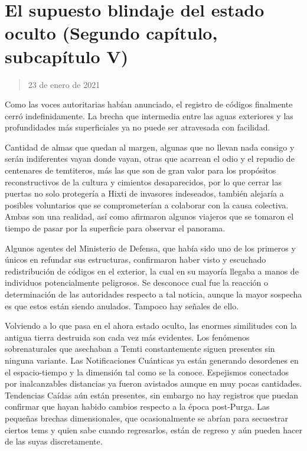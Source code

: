 \documentclass[
  spanish,
]{book}
\begin{document}
\hypertarget{el-supuesto-blindaje-del-estado-oculto-segundo-capuxedtulo-subcapuxedtulo-v}{%
\section{El supuesto blindaje del estado oculto (Segundo capítulo, subcapítulo V)}\label{el-supuesto-blindaje-del-estado-oculto-segundo-capuxedtulo-subcapuxedtulo-v}}

\begin{quote}
23 de enero de 2021
\end{quote}

Como las voces autoritarias habían anunciado, el registro de códigos finalmente cerró indefinidamente. La brecha que intermedia entre las aguas exteriores y las profundidades más superficiales ya no puede ser atravesada con facilidad.

Cantidad de almas que quedan al margen, algunas que no llevan nada consigo y serán indiferentes vayan donde vayan, otras que acarrean el odio y el repudio de centenares de temtiteros, más las que son de gran valor para los propósitos reconstructivos de la cultura y cimientos desaparecidos, por lo que cerrar las puertas no solo protegería a Hixti de invasores indeseados, también alejaría a posibles voluntarios que se comprometerían a colaborar con la causa colectiva. Ambas son una realidad, así como afirmaron algunos viajeros que se tomaron el tiempo de pasar por la superficie para observar el panorama.

Algunos agentes del Ministerio de Defensa, que había sido uno de los primeros y únicos en refundar sus estructuras, confirmaron haber visto y escuchado redistribución de códigos en el exterior, la cual en su mayoría llegaba a manos de individuos potencialmente peligrosos. Se desconoce cual fue la reacción o determinación de las autoridades respecto a tal noticia, aunque la mayor sospecha es que estos están siendo anulados. Tampoco hay señales de ello.

Volviendo a lo que pasa en el ahora estado oculto, las enormes similitudes con la antigua tierra destruida son cada vez más evidentes. Los fenómenos sobrenaturales que asechaban a Temti constantemente siguen presentes sin ninguna variante. Las Notificaciones Cuánticas ya están generando desordenes en el espacio-tiempo y la dimensión tal como se la conoce. Espejismos conectados por inalcanzables distancias ya fueron avistados aunque en muy pocas cantidades.
Tendencias Caídas aún están presentes, sin embargo no hay registros que puedan confirmar que hayan habido cambios respecto a la época post-Purga. Las pequeñas brechas dimensionales, que ocasionalmente se abrían para secuestrar ciertos tems y quien sabe cuando regresarlos, están de regreso y aún pueden hacer de las suyas discretamente.
\end{document}
